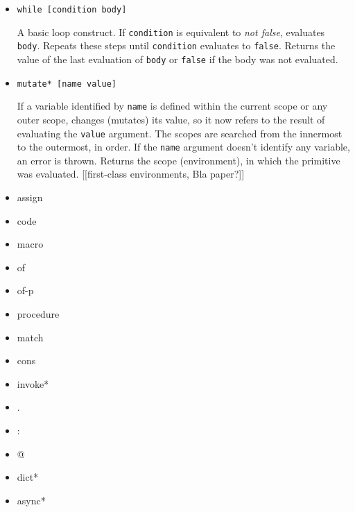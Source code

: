 \begin{itemize}
    \item \texttt{while [condition body]}
    
    A basic loop construct. If \texttt{condition} is equivalent to \textit{not false}, evaluates \texttt{body}. Repeats these steps until \texttt{condition} evaluates to \texttt{false}. Returns the value of the last evaluation of \texttt{body} or \texttt{false} if the body was not evaluated.
    
    \item \texttt{mutate* [name value]}
    
    If a variable identified by \texttt{name} is defined within the current scope or any outer scope, changes (mutates) its value, so it now refers to the result of evaluating the \texttt{value} argument. The scopes are searched from the innermost to the outermost, in order. If the \texttt{name} argument doesn't identify any variable, an error is thrown. Returns the scope (environment), in which the primitive was evaluated. [[first-class environments, Bla paper?]]
    
    \item assign
    
    \item code
    
    \item macro
    
    \item of
    
    \item of-p
    
    \item procedure
    
    \item match
    
    \item cons
    
    \item invoke*
    
    \item .

    \item :
    
    \item @
    
    \item dict*
    
    \item async*
\end{itemize}

